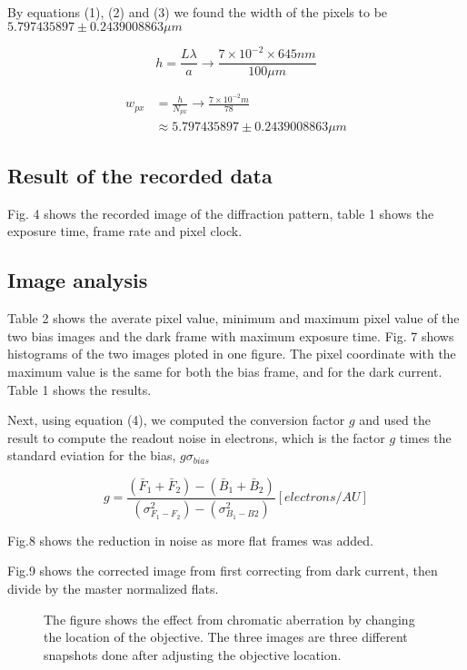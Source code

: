 \documentclass{emulateapj}
\begin{document}
By equations (1), (2) and (3) we found the width of the pixels to be $5.797435897 \pm 0.2439008863 \mu m$

\begin{equation}
h = \frac{L\lambda}{a} \rightarrow \frac{7\times 10^{-2}\times 645 nm}{100\mu m}
\end{equation}

\begin{align}
w_{px} &= \frac{h}{N_{px}} \rightarrow \frac{7\times 10^{-2}m}{78}\\ &\approx5.797435897 \pm 0.2439008863  \mu m
\end{align}


\subsection{Result of the recorded data}

Fig. 4 shows the recorded image of the diffraction pattern, table 1 shows the  exposure time, frame rate and pixel clock.

\subsection{Image analysis}

  Table 2 shows the averate pixel value, minimum and maximum pixel value of the two bias images and the dark frame with maximum exposure time. Fig. 7 shows histograms of the two images ploted in one figure. The pixel coordinate with the maximum value is the same for both the bias frame, and for the dark current. Table 1 shows the results.

  Next, using equation (4), we computed the conversion factor $g$ and used the result to compute the readout noise in electrons, which is the factor $g$ times the standard eviation for the bias, $g\sigma_{bias}$

\begin{equation}
g = \frac{(\bar{F}_1 + \bar{F}_2) - (\bar{B}_1 + \bar{B}_2)}{(\sigma_{F_1-F_2}^2) - (\sigma_{B_1-B2}^2)}[electrons/AU]
\end{equation}

  Fig.8 shows the reduction in noise as more flat frames was added.

  Fig.9 shows the corrected image from first correcting from dark current, then divide by the master normalized flats.


\begin{figure}[H]
\mbox{}
\caption{The figure shows the effect from chromatic aberration by changing the location of the objective. The three images are three different snapshots done after adjusting the objective location.}
\label{fig:figure_rgb_focus}
\end{figure}
\end{document}
